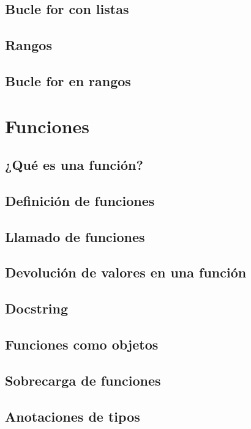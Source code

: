 \documentclass{article}
\begin{document}
\subsection{Bucle for con listas}

\subsection{Rangos}

\subsection{Bucle for en rangos}

\section{Funciones}

\subsection{¿Qué es una función?}

\subsection{Definición de funciones}

\subsection{Llamado de funciones}

\subsection{Devolución de valores en una función}

\subsection{Docstring}

\subsection{Funciones como objetos}

\subsection{Sobrecarga de funciones}

\subsection{Anotaciones de tipos}
\end{document}
